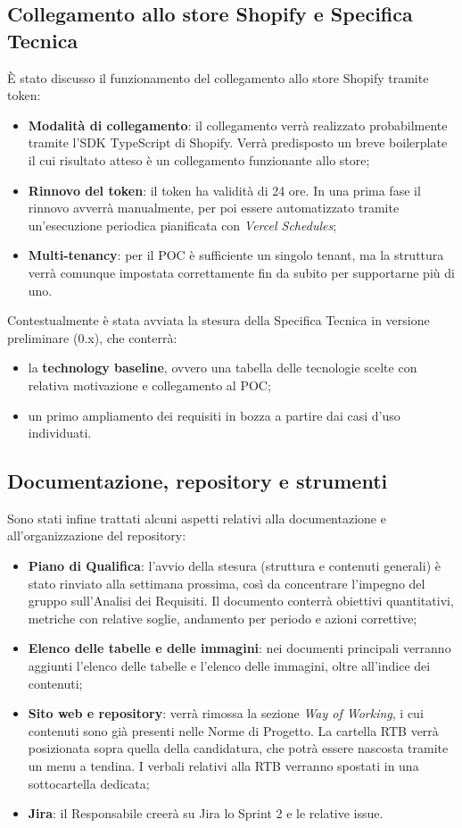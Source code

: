\subsection{Collegamento allo store Shopify e Specifica Tecnica}
È stato discusso il funzionamento del collegamento allo store Shopify tramite token:
\begin{itemize}
    \item \textbf{Modalità di collegamento}: il collegamento verrà realizzato probabilmente tramite l'SDK TypeScript di Shopify. Verrà predisposto un breve boilerplate il cui risultato atteso è un collegamento funzionante allo store;
    \item \textbf{Rinnovo del token}: il token ha validità di 24 ore. In una prima fase il rinnovo avverrà manualmente, per poi essere automatizzato tramite un'esecuzione periodica pianificata con \emph{Vercel Schedules};
    \item \textbf{Multi-tenancy}: per il POC è sufficiente un singolo tenant, ma la struttura verrà comunque impostata correttamente fin da subito per supportarne più di uno.
\end{itemize}
Contestualmente è stata avviata la stesura della Specifica Tecnica in versione preliminare (0.x), che conterrà:
\begin{itemize}
    \item la \textbf{technology baseline}, ovvero una tabella delle tecnologie scelte con relativa motivazione e collegamento al POC;
    \item un primo ampliamento dei requisiti in bozza a partire dai casi d'uso individuati.
\end{itemize}

\newpage
\subsection{Documentazione, repository e strumenti}
Sono stati infine trattati alcuni aspetti relativi alla documentazione e all'organizzazione del repository:
\begin{itemize}
    \item \textbf{Piano di Qualifica}: l'avvio della stesura (struttura e contenuti generali) è stato rinviato alla settimana prossima, così da concentrare l'impegno del gruppo sull'Analisi dei Requisiti. Il documento conterrà obiettivi quantitativi, metriche con relative soglie, andamento per periodo e azioni correttive;
    \item \textbf{Elenco delle tabelle e delle immagini}: nei documenti principali verranno aggiunti l'elenco delle tabelle e l'elenco delle immagini, oltre all'indice dei contenuti;
    \item \textbf{Sito web e repository}: verrà rimossa la sezione \emph{Way of Working}, i cui contenuti sono già presenti nelle Norme di Progetto. La cartella RTB verrà posizionata sopra quella della candidatura, che potrà essere nascosta tramite un menu a tendina. I verbali relativi alla RTB verranno spostati in una sottocartella dedicata;
    \item \textbf{Jira}: il Responsabile creerà su Jira lo Sprint 2 e le relative issue.
\end{itemize}

